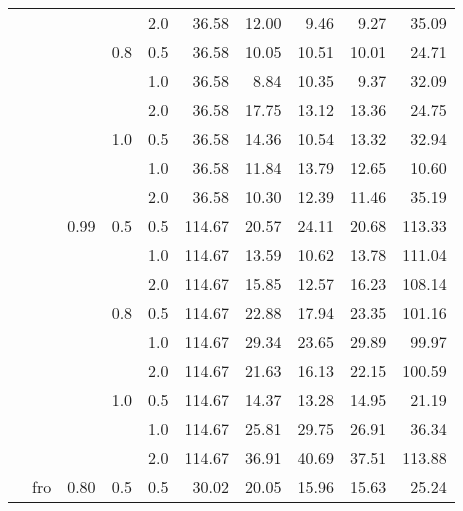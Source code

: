 \documentclass{article}
\begin{document}
{\begin{tabular}{lllllrrrrr}
            &     &      &     & 2.0 &   36.58 &   12.00 &              9.46 &                 9.27 &      35.09 \\
            &     &      & 0.8 & 0.5 &   36.58 &   10.05 &             10.51 &                10.01 &      24.71 \\
            &     &      &     & 1.0 &   36.58 &    8.84 &             10.35 &                 9.37 &      32.09 \\
            &     &      &     & 2.0 &   36.58 &   17.75 &             13.12 &                13.36 &      24.75 \\
            &     &      & 1.0 & 0.5 &   36.58 &   14.36 &             10.54 &                13.32 &      32.94 \\
            &     &      &     & 1.0 &   36.58 &   11.84 &             13.79 &                12.65 &      10.60 \\
            &     &      &     & 2.0 &   36.58 &   10.30 &             12.39 &                11.46 &      35.19 \\
            &     & 0.99 & 0.5 & 0.5 &  114.67 &   20.57 &             24.11 &                20.68 &     113.33 \\
            &     &      &     & 1.0 &  114.67 &   13.59 &             10.62 &                13.78 &     111.04 \\
            &     &      &     & 2.0 &  114.67 &   15.85 &             12.57 &                16.23 &     108.14 \\
            &     &      & 0.8 & 0.5 &  114.67 &   22.88 &             17.94 &                23.35 &     101.16 \\
            &     &      &     & 1.0 &  114.67 &   29.34 &             23.65 &                29.89 &      99.97 \\
            &     &      &     & 2.0 &  114.67 &   21.63 &             16.13 &                22.15 &     100.59 \\
            &     &      & 1.0 & 0.5 &  114.67 &   14.37 &             13.28 &                14.95 &      21.19 \\
            &     &      &     & 1.0 &  114.67 &   25.81 &             29.75 &                26.91 &      36.34 \\
            &     &      &     & 2.0 &  114.67 &   36.91 &             40.69 &                37.51 &     113.88 \\
            & fro & 0.80 & 0.5 & 0.5 &   30.02 &   20.05 &             15.96 &                15.63 &      25.24 \\

\end{tabular}}
\end{document}
